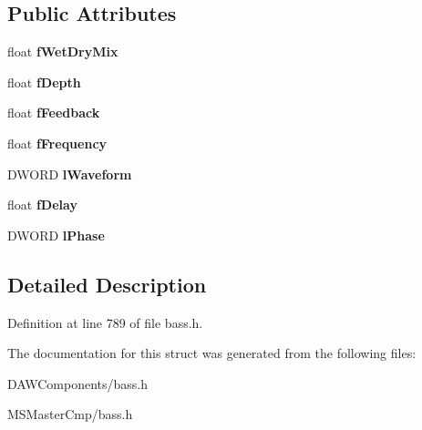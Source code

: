 \subsection*{Public Attributes}
\begin{DoxyCompactItemize}
\item 
\hypertarget{struct_b_a_s_s___d_x8___f_l_a_n_g_e_r_ac538b83d3967c7f5658f05a020f86b1b_ac538b83d3967c7f5658f05a020f86b1b}{float {\bfseries f\-Wet\-Dry\-Mix}}\label{struct_b_a_s_s___d_x8___f_l_a_n_g_e_r_ac538b83d3967c7f5658f05a020f86b1b_ac538b83d3967c7f5658f05a020f86b1b}

\item 
\hypertarget{struct_b_a_s_s___d_x8___f_l_a_n_g_e_r_ad3e6b0734a3eca90563e76d660b41326_ad3e6b0734a3eca90563e76d660b41326}{float {\bfseries f\-Depth}}\label{struct_b_a_s_s___d_x8___f_l_a_n_g_e_r_ad3e6b0734a3eca90563e76d660b41326_ad3e6b0734a3eca90563e76d660b41326}

\item 
\hypertarget{struct_b_a_s_s___d_x8___f_l_a_n_g_e_r_ae28f1dfe21710942e12599ccc6e48ca7_ae28f1dfe21710942e12599ccc6e48ca7}{float {\bfseries f\-Feedback}}\label{struct_b_a_s_s___d_x8___f_l_a_n_g_e_r_ae28f1dfe21710942e12599ccc6e48ca7_ae28f1dfe21710942e12599ccc6e48ca7}

\item 
\hypertarget{struct_b_a_s_s___d_x8___f_l_a_n_g_e_r_ab0bb5ca242d239183c4caa369b7575e7_ab0bb5ca242d239183c4caa369b7575e7}{float {\bfseries f\-Frequency}}\label{struct_b_a_s_s___d_x8___f_l_a_n_g_e_r_ab0bb5ca242d239183c4caa369b7575e7_ab0bb5ca242d239183c4caa369b7575e7}

\item 
\hypertarget{struct_b_a_s_s___d_x8___f_l_a_n_g_e_r_ae05f4fd19f4938bea9b178077f1c6ac5_ae05f4fd19f4938bea9b178077f1c6ac5}{D\-W\-O\-R\-D {\bfseries l\-Waveform}}\label{struct_b_a_s_s___d_x8___f_l_a_n_g_e_r_ae05f4fd19f4938bea9b178077f1c6ac5_ae05f4fd19f4938bea9b178077f1c6ac5}

\item 
\hypertarget{struct_b_a_s_s___d_x8___f_l_a_n_g_e_r_a912410d445465d67601775f4cccdee4e_a912410d445465d67601775f4cccdee4e}{float {\bfseries f\-Delay}}\label{struct_b_a_s_s___d_x8___f_l_a_n_g_e_r_a912410d445465d67601775f4cccdee4e_a912410d445465d67601775f4cccdee4e}

\item 
\hypertarget{struct_b_a_s_s___d_x8___f_l_a_n_g_e_r_a2dd3286e5ffc91673f0f1594ad4d2b8a_a2dd3286e5ffc91673f0f1594ad4d2b8a}{D\-W\-O\-R\-D {\bfseries l\-Phase}}\label{struct_b_a_s_s___d_x8___f_l_a_n_g_e_r_a2dd3286e5ffc91673f0f1594ad4d2b8a_a2dd3286e5ffc91673f0f1594ad4d2b8a}

\end{DoxyCompactItemize}


\subsection{Detailed Description}


Definition at line 789 of file bass.\-h.



The documentation for this struct was generated from the following files\-:\begin{DoxyCompactItemize}
\item 
D\-A\-W\-Components/bass.\-h\item 
M\-S\-Master\-Cmp/bass.\-h\end{DoxyCompactItemize}
